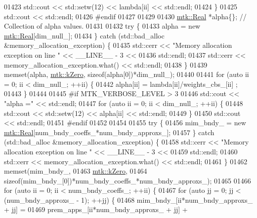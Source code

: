 \begin{DoxyCode}
{{01423     std::cout << std::setw(12) << lambda[ii] << std::endl;
01424   \}
01425   std::cout << std::endl;
01426 \textcolor{preprocessor}{  #endif}
01427 
01429 
01430   \hyperlink{group__c01-roots_gac080bbbf5cbb5502c9f00405f894857d}{mtk::Real} *alpha\{\}; \textcolor{comment}{// Collection of alpha values.}
01431 
01432   \textcolor{keywordflow}{try} \{
01433     alpha = \textcolor{keyword}{new} \hyperlink{group__c01-roots_gac080bbbf5cbb5502c9f00405f894857d}{mtk::Real}[dim\_null\_];
01434   \} \textcolor{keywordflow}{catch} (std::bad\_alloc &memory\_allocation\_exception) \{
01435     std::cerr << \textcolor{stringliteral}{"Memory allocation exception on line "} << \_\_LINE\_\_ - 3 <<
01436       std::endl;
01437     std::cerr << memory\_allocation\_exception.what() << std::endl;
01438   \}
01439   memset(alpha, \hyperlink{group__c01-roots_ga59a451a5fae30d59649bcda274fea271}{mtk::kZero}, \textcolor{keyword}{sizeof}(alpha[0])*dim\_null\_);
01440 
01441   \textcolor{keywordflow}{for} (\textcolor{keyword}{auto} ii = 0; ii < dim\_null\_; ++ii) \{
01442     alpha[ii] = lambda[ii]/weights\_cbs\_[ii] ;
01443   \}
01444 
01445 \textcolor{preprocessor}{  #if MTK\_VERBOSE\_LEVEL > 3}
01446   std::cout << \textcolor{stringliteral}{"alpha ="} << std::endl;
01447   \textcolor{keywordflow}{for} (\textcolor{keyword}{auto} ii = 0; ii < dim\_null\_; ++ii) \{
01448     std::cout << std::setw(12) << alpha[ii] << std::endl;
01449   \}
01450   std::cout << std::endl;
01451 \textcolor{preprocessor}{  #endif}
01452 
01454 
01455   \textcolor{keywordflow}{try} \{
01456     mim\_bndy\_ = \textcolor{keyword}{new} \hyperlink{group__c01-roots_gac080bbbf5cbb5502c9f00405f894857d}{mtk::Real}[num\_bndy\_coeffs\_*num\_bndy\_approxs\_];
01457   \} \textcolor{keywordflow}{catch} (std::bad\_alloc &memory\_allocation\_exception) \{
01458     std::cerr << \textcolor{stringliteral}{"Memory allocation exception on line "} << \_\_LINE\_\_ - 3 <<
01459       std::endl;
01460     std::cerr << memory\_allocation\_exception.what() << std::endl;
01461   \}
01462   memset(mim\_bndy\_,
01463          \hyperlink{group__c01-roots_ga59a451a5fae30d59649bcda274fea271}{mtk::kZero},
01464          \textcolor{keyword}{sizeof}(mim\_bndy\_[0])*num\_bndy\_coeffs\_*num\_bndy\_approxs\_);
01465 
01466   \textcolor{keywordflow}{for} (\textcolor{keyword}{auto} ii = 0; ii < num\_bndy\_coeffs\_; ++ii) \{
01467     \textcolor{keywordflow}{for} (\textcolor{keyword}{auto} jj = 0; jj < (num\_bndy\_approxs\_ - 1); ++jj) \{
01468       mim\_bndy\_[ii*num\_bndy\_approxs\_ + jj] =
01469         prem\_apps\_[ii*num\_bndy\_approxs\_ + jj] +
}}
\end{DoxyCode}

